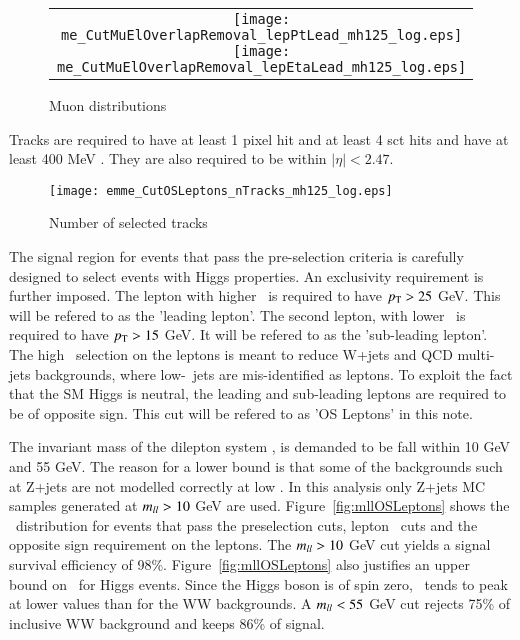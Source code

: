 \begin{figure}[!h]
\centering
\begin{tabular}{c}
	\texttt{[image: me\_CutMuElOverlapRemoval\_lepPtLead\_mh125\_log.eps]}
	\texttt{[image: me\_CutMuElOverlapRemoval\_lepEtaLead\_mh125\_log.eps]}\\
\end{tabular}
\caption{Muon distributions}
\label{fig:muons}
\end{figure}

\par Tracks are required to have at least 1 pixel hit and at least 4 sct hits and 
have at least 400 MeV \pt. They are also required to be within $|\eta|<2.47$.

\begin{figure}[!h]
\centering
	\texttt{[image: emme\_CutOSLeptons\_nTracks\_mh125\_log.eps]}\\
\caption{Number of selected tracks}
\label{fig:nTracks.}
\end{figure}

\par The signal region for events that pass the pre-selection criteria is carefully 
designed to select events with Higgs properties. An exclusivity requirement is further imposed.
The lepton with higher \pt\ is required to have $p_{\mathrm{T}}>25$ GeV. This will be refered to as the 'leading 
lepton'. The second lepton, with lower \pt\ is required to have $p_{\mathrm{T}}>15$ GeV. It will 
be refered to as the 'sub-leading lepton'. The high \pt\ selection on the leptons  is 
meant to reduce W+jets and QCD multi-jets backgrounds, where low-\pt\ jets are 
mis-identified as leptons. To exploit the fact that the SM Higgs is neutral, the 
leading and sub-leading leptons are required to be of opposite sign. This cut will be refered to 
as 'OS Leptons' in this note. 
\par The invariant mass of the dilepton system \mll, is demanded to 
be fall within 10 GeV and 55 GeV. The reason for a lower bound is that 
some of the backgrounds such at Z+jets are not modelled correctly at low \mll. In this analysis
only Z+jets MC samples generated at $m_{ll}>10$ GeV are used. Figure~\ref{fig:mllOSLeptons}
shows the \mll\ distribution for events that pass the preselection cuts, lepton \pt\ cuts
and the opposite sign requirement on the leptons. The $m_{ll}>10$ GeV cut yields a 
signal survival efficiency of 98\%. Figure~\ref{fig:mllOSLeptons} also justifies an upper bound on 
\mll\ for Higgs events. Since the Higgs boson is of spin zero, \mll\ tends to peak at lower
 values than for the WW backgrounds. A $m_{ll}<55$ GeV cut rejects 75\% of inclusive WW background 
and keeps 86\% of signal. 

